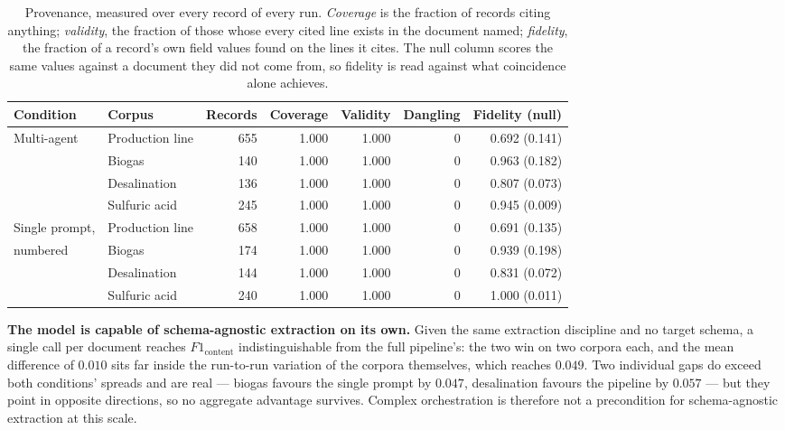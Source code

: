 \documentclass[11pt]{article}
\begin{document}
\begin{table}[H]
\centering
\caption{Provenance, measured over every record of every run. \emph{Coverage} is
the fraction of records citing anything; \emph{validity}, the fraction of those
whose every cited line exists in the document named; \emph{fidelity}, the
fraction of a record's own field values found on the lines it cites. The null
column scores the same values against a document they did not come from, so
fidelity is read against what coincidence alone achieves.}
\label{tab:provenance}
\small
\begin{tabular}{llrrrrr}
\toprule
\textbf{Condition} & \textbf{Corpus} & \textbf{Records} & \textbf{Coverage} &
\textbf{Validity} & \textbf{Dangling} & \textbf{Fidelity (null)} \\
\midrule
Multi-agent & Production line & 655 & 1.000 & 1.000 & 0 & 0.692 (0.141) \\
            & Biogas          & 140 & 1.000 & 1.000 & 0 & 0.963 (0.182) \\
            & Desalination    & 136 & 1.000 & 1.000 & 0 & 0.807 (0.073) \\
            & Sulfuric acid   & 245 & 1.000 & 1.000 & 0 & 0.945 (0.009) \\
\midrule
Single prompt, & Production line & 658 & 1.000 & 1.000 & 0 & 0.691 (0.135) \\
numbered       & Biogas          & 174 & 1.000 & 1.000 & 0 & 0.939 (0.198) \\
               & Desalination    & 144 & 1.000 & 1.000 & 0 & 0.831 (0.072) \\
               & Sulfuric acid   & 240 & 1.000 & 1.000 & 0 & 1.000 (0.011) \\
\bottomrule
\end{tabular}
\end{table}

\textbf{The model is capable of schema-agnostic extraction on its own.} Given
the same extraction discipline and no target schema, a single call per document
reaches $F1_{\text{content}}$ indistinguishable from the full pipeline's: the two
win on two corpora each, and the mean difference of $0.010$ sits far inside the
run-to-run variation of the corpora themselves, which reaches $0.049$. Two
individual gaps do exceed both conditions' spreads and are real --- biogas
favours the single prompt by $0.047$, desalination favours the pipeline by
$0.057$ --- but they point in opposite directions, so no aggregate advantage
survives. Complex orchestration is therefore not a precondition for
schema-agnostic extraction at this scale.
\end{document}

